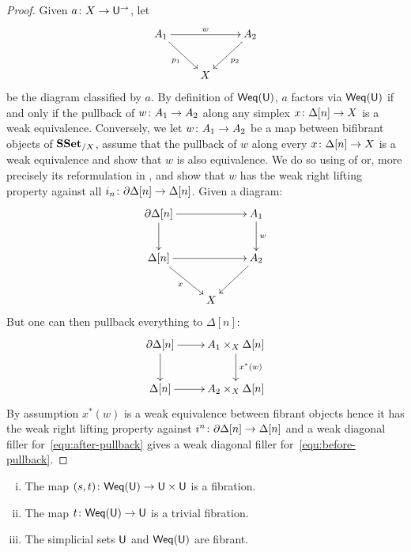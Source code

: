 \documentclass[reqno,10pt,a4paper,oneside,draft]{amsart}
\begin{document}
\begin{proof} Given $a \colon X \rightarrow \mathsf{U}^{\rightarrow}$, let  
\[
\xymatrix{
A_1 \ar[rr]^w  \ar[dr]_{p_1} & & A_2 \ar[dl]^{p_2} \\
 & X & }
 \]
be the diagram classified by $a$.  By definition of $\mathsf{Weq}(\mathsf{U})$, $a$ factors via $\mathsf{Weq}(\mathsf{U})$ if and only if the pullback of $w \colon A_1 \to A_2$ along any simplex $x \colon \Delta[n] \rightarrow X$  is a weak equivalence.  Conversely,
we let $w \colon A_1 \rightarrow A_2$ be a map between bifibrant objects of $\mathbf{SSet}_{/X}$, assume that the pullback of $w$ along every $x \colon \Delta[n] \rightarrow X$ is a weak equivalence and show that $w$ is also equivalence.  We do so using  of \cite[Theorem 2.5.6]{henry2018wms} or, more precisely its reformulation in \cite[\S 2.5.7]{henry2018wms}, and show that $w$ has the weak right lifting property against all $i_n \colon \partial \Delta[n] \rightarrow \Delta[n]$. Given a diagram:
\begin{equation}
\label{equ:before-pullback}
\begin{gathered}
\xymatrix{\partial \Delta[n] \ar[rr] \ar[d] & & A_1 \ar[d]^w \\
\Delta[n] \ar[rr] \ar[dr]_{x}
 & & A_2 \ar[dl] \\
& X &}  
\end{gathered}
\end{equation}
But one can then pullback everything to $\Delta[n]$:
\begin{equation}
\label{equ:after-pullback}
\begin{gathered}
\xymatrix{
\partial \Delta[n] \ar[r] \ar[d] & A_1 \times_X \Delta[n] \ar[d]^{x^*(w)} \\
\Delta[n] \ar[r] & A_2 \times_X \Delta[n]  
} 
\end{gathered}
\end{equation}
By assumption $x^*(w)$ is a weak equivalence between fibrant objects hence it has the weak right lifting property against $i^n \colon \partial \Delta[n] \rightarrow \Delta[n]$ and a weak diagonal filler for~\eqref{equ:after-pullback} gives  a weak diagonal filler for~\eqref{equ:before-pullback}.
\end{proof}



\begin{proposition} \label{thm:fibrancy-of-u} \hfill 
\begin{enumerate}[(i)]
\item The map $(s, t) \colon \mathsf{Weq}(\mathsf{U}) \rightarrow \mathsf{U} \times \mathsf{U}$ is a fibration.
\item The map $t \colon \mathsf{Weq}(\mathsf{U}) \rightarrow \mathsf{U}$ is a trivial fibration.
\item The simplicial sets $\mathsf{U}$ and $\mathsf{Weq}(\mathsf{U})$ are fibrant.
\end{enumerate}
\end{proposition}
\end{document}
